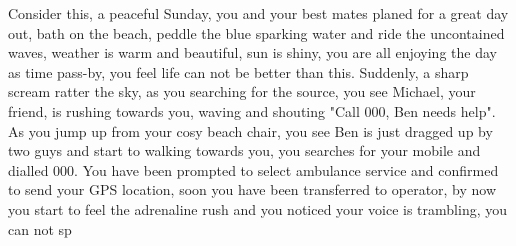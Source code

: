 Consider this, a peaceful Sunday, you and your best mates planed for a great day out, bath on the beach, peddle the blue sparking water and ride the uncontained waves, weather is warm and beautiful, sun is shiny, you are all enjoying the day as time pass-by, you feel life can not be better than this. Suddenly, a sharp scream ratter the sky, as you searching for the source, you see Michael, your friend, is rushing towards you, waving and shouting "Call 000, Ben needs help". As you jump up from your cosy beach chair, you see Ben is just dragged up by two guys and start to walking towards you, you searches for your mobile and dialled 000. You have been prompted to select ambulance service and confirmed to send your GPS location, soon you have been transferred to operator, by now you start to feel the adrenaline rush and you noticed your voice is trambling, you can not sp